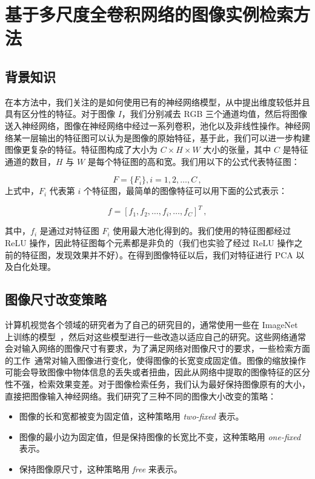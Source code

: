 \section{基于多尺度全卷积网络的图像实例检索方法}\label{sec:mfc_factor_explaination}
\subsection{背景知识}
在本方法中，我们关注的是如何使用已有的神经网络模型，从中提出维度较低并且具有区分性的特征。对于图像 $I$，我们分别减去 RGB 三个通道均值，然后将图像送入神经网络，图像在神经网络中经过一系列卷积，池化以及非线性操作。神经网络某一层输出的特征图可以认为是图像的原始特征，基于此，我们可以进一步构建图像更复杂的特征。特征图构成了大小为 $C \times H \times  W$ 大小的张量，其中 $C$ 是特征通道的数目，$H$ 与 $W$ 是每个特征图的高和宽。我们用以下的公式代表特征图：

\begin{equation}
F=\{F_i\}, i=1,2,\ldots, C\, ,
\end{equation}
上式中，$F_i$ 代表第 $i$ 个特征图，最简单的图像特征可以用下面的公式表示：

\begin{equation}\label{eq:single_scale}
f = [f_1, f_2, \ldots, f_i, \ldots, f_C]^T\, ,
\end{equation}

其中，$f_i$ 是通过对特征图 $F_i$ 使用最大池化得到的。我们使用的特征图都经过 ReLU 操作，因此特征图每个元素都是非负的（我们也实验了经过 ReLU 操作之前的特征图，发现效果并不好）。在得到图像特征以后，我们对特征进行 PCA 以及白化处理。

\subsection{图像尺寸改变策略}\label{subsec:img_resize_strategy}
计算机视觉各个领域的研究者为了自己的研究目的，通常使用一些在 ImageNet~\cite{Russakovsky2015ImageNetLS} 上训练的模型~\cite{Krizhevsky2012ImageNetCW,Simonyan2014VeryDC,Szegedy2015GoingDW,He2016DeepRL}，然后对这些模型进行一些改造以适应自己的研究。这些网络通常会对输入网络的图像尺寸有要求，为了满足网络对图像尺寸的要求，一些检索方面的工作~\cite{Gong2014MultiscaleOP,Babenko2015AggregatingLD}通常对输入图像进行变化，使得图像的长宽变成固定值。图像的缩放操作可能会导致图像中物体信息的丢失或者扭曲，因此从网络中提取的图像特征的区分性不强，检索效果变差。对于图像检索任务，我们认为最好保持图像原有的大小，直接把图像输入神经网络。我们研究了三种不同的图像大小改变的策略：
\begin{itemize}
\item 图像的长和宽都被变为固定值，这种策略用 \emph{two-fixed} 表示。

\item 图像的最小边为固定值，但是保持图像的长宽比不变，这种策略用 \emph{one-fixed} 表示。

\item 保持图像原尺寸，这种策略用 \emph{free} 来表示。
\end{itemize}

